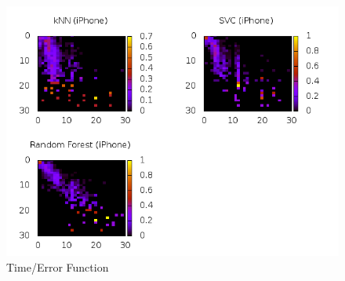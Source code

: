 \begin{figure}
\centering
\includegraphics[scale=0.55]{images/plots/machine_learning/iphone/conf_mat_iphone.png}
\caption{Time/Error Function}
\label{crowdsourcing_desc_length}
\end{figure}

